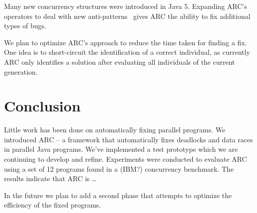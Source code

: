 \documentclass{llncs}
\begin{document}
Many new concurrency structures were introduced in Java 5. Expanding ARC's
operators to deal with new anti-patterns~\cite{BJ09, FKLV12, BCD06} gives ARC
the ability to fix additional types of bugs.

We plan to optimize ARC's approach to reduce the time taken for finding a fix.
One idea is to short-circuit the identification of a correct individual, as
currently ARC only identifies a solution after evaluating all individuals of
the current generation.

\section{Conclusion}
\label{sec:conclusion}

Little work has been done on automatically fixing parallel programs. We
introduced ARC -- a framework that automatically fixes deadlocks and data races
in parallel Java programs. We've implemented a test prototype which we are
continuing to develop and refine.  Experiments were conducted to evaluate
ARC using a set of 12 programs found in a (IBM?) concurrency benchmark. The
results indicate that ARC is \ldots %

In the future we plan to add a second phase that attempts to optimize the
efficiency of the fixed programs.




\end{document}
